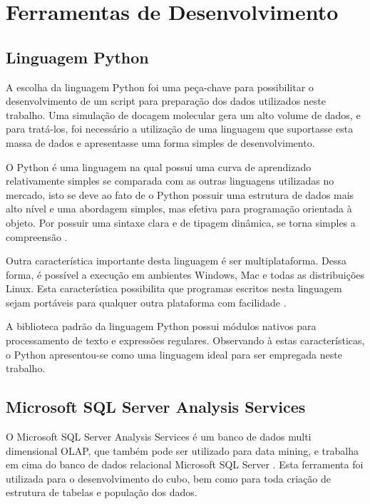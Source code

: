 \chapter{Ferramentas de Desenvolvimento}

\section{Linguagem Python}
A escolha da linguagem Python foi uma peça-chave para possibilitar o desenvolvimento de um script para preparação dos dados utilizados neste trabalho. Uma simulação de docagem molecular gera um alto volume de dados, e para tratá-los, foi necessário a utilização de uma linguagem que suportasse esta massa de dados e apresentasse uma forma simples de desenvolvimento.

O Python é uma linguagem na qual possui uma curva de aprendizado relativamente simples se comparada com as outras linguagens utilizadas no mercado, isto se deve ao fato de o Python possuir uma estrutura de dados mais alto nível e uma abordagem simples, mas efetiva para programação orientada à objeto. Por possuir uma sintaxe clara e de tipagem dinâmica, se torna simples a compreensão \cite{pyt00}. 

Outra característica importante desta linguagem é ser multiplataforma. Dessa forma, é possível a execução em ambientes Windows, Mac e todas as distribuições Linux. Esta característica possibilita que programas escritos nesta linguagem sejam portáveis para qualquer outra plataforma com facilidade \cite{pyt01}.

A biblioteca padrão da linguagem Python possui módulos nativos para processamento de texto e expressões regulares. Observando à estas características, o Python apresentou-se como uma linguagem ideal para ser empregada neste trabalho.

\section{Microsoft SQL Server Analysis Services}
O Microsoft SQL Server Analysis Services é um banco de dados multi dimensional OLAP, que também pode ser utilizado para data mining, e trabalha em cima do banco de dados relacional Microsoft SQL Server \cite{SIVSTE05}. Esta ferramenta foi utilizada para o desenvolvimento do cubo, bem como para toda criação de estrutura de tabelas e população dos dados.

